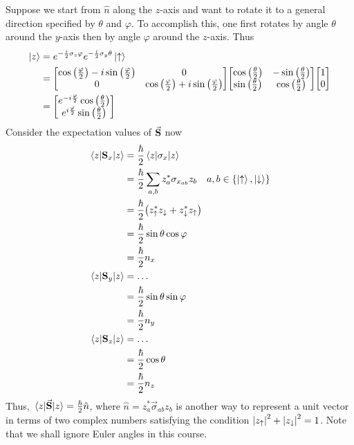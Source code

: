 \documentclass[12pt,a4paper,titlepage]{article}
\newcommand{\up}{\uparrow} %
\newcommand{\dn}{\downarrow} %
\begin{document}
Suppose we start from $\hat{n}$ along the $z$-axis and want to rotate it to a general direction specified by $\theta$ and $\varphi$. To accomplish this, one first rotates by angle $\theta$ around the $y$-axis then by angle $\varphi$ around the $z$-axis. Thus
\begin{equation}
\begin{aligned}
\ket{z}&=e^{-\frac{i}{2}\sigma_{z}\varphi}e^{-\frac{i}{2}\sigma_{y}\theta}\ket{\up}\\
&=\mqty[\cos\qty(\frac{\varphi}{2})-i\sin\qty(\frac{\varphi}{2}) & 0\\0 & \cos\qty(\frac{\varphi}{2})+i\sin\qty(\frac{\varphi}{2})]\mqty[\cos\qty(\frac{\theta}{2}) & -\sin\qty(\frac{\theta}{2}) \\ \sin\qty(\frac{\theta}{2}) & \cos\qty(\frac{\theta}{2})]\mqty[1\\0]\\
&=\mqty[e^{-i\frac{\varphi}{2}}\cos\qty(\frac{\theta}{2}) \\ e^{i\frac{\varphi}{2}}\sin\qty(\frac{\theta}{2})]
\end{aligned}
\end{equation}
Consider the expectation values of $\vec{\vb{S}}$ now
\begin{equation}
\begin{aligned}
\mel{z}{\vb{S}_{x}}{z}&=\frac{\hbar}{2}\mel{z}{\sigma_{x}}{z}\\
&=\frac{\hbar}{2}\sum_{a,b}z_{a}^{*}\sigma_{x_{ab}}z_{b}\quad a,b\in\{\ket{\up},\ket{\dn}\}\\
&=\frac{\hbar}{2}\qty(z_{\up}^{*}z_{\dn}+z_{\dn}^{*}z_{\up})\\
&=\frac{\hbar}{2}\sin\theta\cos\varphi\\
&=\frac{\hbar}{2}n_{x}\\
\mel{z}{\vb{S}_{y}}{z}&=\ldots\\
&=\frac{\hbar}{2}\sin\theta\sin\varphi\\
&=\frac{\hbar}{2}n_{y}\\
\mel{z}{\vb{S}_{z}}{z}&=\ldots\\
&=\frac{\hbar}{2}\cos\theta\\
&=\frac{\hbar}{2}n_{z}
\end{aligned}
\end{equation}
Thus, $\mel{z}{\vec{\vb{S}}}{z}=\frac{\hbar}{2}\hat{n}$, where $\hat{n}=z_{a}^{*}\vec{\sigma}_{ab}z_{b}$ is another way to represent a unit vector in terms of two complex numbers satisfying the condition $\abs{z_{\up}}^{2}+\abs{z_{\dn}}^{2}=1$. Note that we shall ignore Euler angles in this course.
\end{document}
